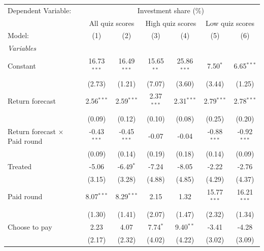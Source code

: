 \begingroup
\centering
\begin{tabular}{lcccccc}
   \tabularnewline \midrule \midrule
   Dependent Variable: & \multicolumn{6}{c}{Investment share (\%)}\\
    & \multicolumn{2}{c}{All quiz scores} & \multicolumn{2}{c}{High quiz scores} & \multicolumn{2}{c}{Low quiz scores} \\ 
   Model:                               & (1)           & (2)           & (3)           & (4)           & (5)           & (6)\\  
   \midrule
   \emph{Variables}\\
   Constant                             & 16.73$^{***}$ & 16.49$^{***}$ & 15.65$^{**}$  & 25.86$^{***}$ & 7.50$^{*}$    & 6.65$^{***}$\\   
                                        & (2.73)        & (1.21)        & (7.07)        & (3.60)        & (3.44)        & (1.25)\\   
   Return forecast                      & 2.56$^{***}$  & 2.59$^{***}$  & 2.37$^{***}$  & 2.31$^{***}$  & 2.79$^{***}$  & 2.78$^{***}$\\   
                                        & (0.09)        & (0.12)        & (0.10)        & (0.08)        & (0.25)        & (0.20)\\   
   Return forecast $\times$ Paid round  & -0.43$^{***}$ & -0.45$^{***}$ & -0.07         & -0.04         & -0.88$^{***}$ & -0.92$^{***}$\\   
                                        & (0.09)        & (0.14)        & (0.19)        & (0.18)        & (0.14)        & (0.09)\\   
   Treated                              & -5.06         & -6.49$^{*}$   & -7.24         & -8.05         & -2.22         & -2.76\\   
                                        & (3.15)        & (3.28)        & (4.88)        & (4.85)        & (4.29)        & (4.37)\\   
   Paid round                           & 8.07$^{***}$  & 8.29$^{***}$  & 2.15          & 1.32          & 15.77$^{***}$ & 16.21$^{***}$\\   
                                        & (1.30)        & (1.41)        & (2.07)        & (1.47)        & (2.32)        & (1.34)\\   
   Choose to pay                        & 2.23          & 4.07          & 7.74$^{*}$    & 9.40$^{**}$   & -3.41         & -4.28\\   
                                        & (2.17)        & (2.32)        & (4.02)        & (4.22)        & (3.02)        & (3.09)\\   

\end{tabular}
